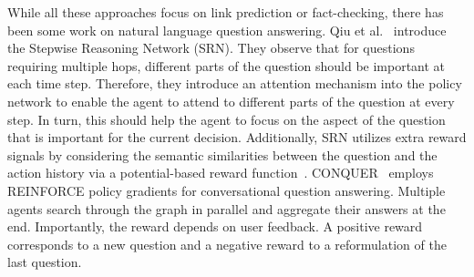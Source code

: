 While all these approaches focus on link prediction or fact-checking, there has been some work on natural language question answering.
Qiu et al.~\cite{Qiu2020Stepwise} introduce the Stepwise Reasoning Network (SRN).
They observe that for questions requiring multiple hops, different parts of the question should be important at each time step. Therefore, they introduce an attention mechanism into the policy network to enable the agent to attend to different parts of the question at every step. In turn, this should help the agent to focus on the aspect of the question that is important for the current decision. Additionally, SRN utilizes extra reward signals by considering the semantic similarities between the question and the action history via a potential-based reward function~\cite{Ng1999Potential}. CONQUER~\cite{Kaiser2021Reinforcement} employs REINFORCE policy gradients for conversational question answering. Multiple agents search through the graph in parallel and aggregate their answers at the end. Importantly, the reward depends on user feedback. A positive reward corresponds to a new question and a negative reward to a reformulation of the last question.







